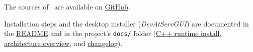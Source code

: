 The sources of \pkg\ are available on
\href{https://github.com/test-fullautomation/python-microservice-base}{GitHub}.

Installation steps and the desktop installer (\textit{DevAtServGUI}) are documented in
the \href{https://github.com/test-fullautomation/python-microservice-base/blob/develop/README.rst}{README}
and in the project's \texttt{docs/} folder
(\href{https://github.com/test-fullautomation/python-microservice-base/blob/develop/docs/runtime\_cpp\_install.html}{C++ runtime install},
\href{https://github.com/test-fullautomation/python-microservice-base/blob/develop/docs/architecture.html}{architecture overview},
and \href{https://github.com/test-fullautomation/python-microservice-base/blob/develop/docs/changelog.html}{changelog}).
